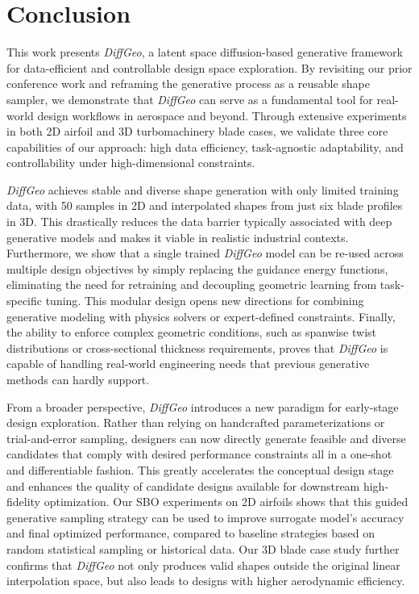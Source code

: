 \section{Conclusion}
\label{ch6:sec:conclusion}
This work presents \textit{DiffGeo}, a latent space diffusion-based generative framework for data-efficient and controllable design space exploration. By revisiting our prior conference work and reframing the generative process as a reusable shape sampler, we demonstrate that \textit{DiffGeo} can serve as a fundamental tool for real-world design workflows in aerospace and beyond. Through extensive experiments in both 2D airfoil and 3D turbomachinery blade cases, we validate three core capabilities of our approach: high data efficiency, task-agnostic adaptability, and controllability under high-dimensional constraints.

\textit{DiffGeo} achieves stable and diverse shape generation with only limited training data, with 50 samples in 2D and interpolated shapes from just six blade profiles in 3D. This drastically reduces the data barrier typically associated with deep generative models and makes it viable in realistic industrial contexts. Furthermore, we show that a single trained \textit{DiffGeo} model can be re-used across multiple design objectives by simply replacing the guidance energy functions, eliminating the need for retraining and decoupling geometric learning from task-specific tuning. This modular design opens new directions for combining generative modeling with physics solvers or expert-defined constraints. Finally, the ability to enforce complex geometric conditions, such as spanwise twist distributions or cross-sectional thickness requirements, proves that \textit{DiffGeo} is capable of handling real-world engineering needs that previous generative methods can hardly support.

From a broader perspective, \textit{DiffGeo} introduces a new paradigm for early-stage design exploration. Rather than relying on handcrafted parameterizations or trial-and-error sampling, designers can now directly generate feasible and diverse candidates that comply with desired performance constraints all in a one-shot and differentiable fashion. This greatly accelerates the conceptual design stage and enhances the quality of candidate designs available for downstream high-fidelity optimization. Our SBO experiments on 2D airfoils shows that this guided generative sampling strategy can be used to improve surrogate model's accuracy and final optimized performance, compared to baseline strategies based on random statistical sampling or historical data. Our 3D blade case study further confirms that \textit{DiffGeo} not only produces valid shapes outside the original linear interpolation space, but also leads to designs with higher aerodynamic efficiency.

